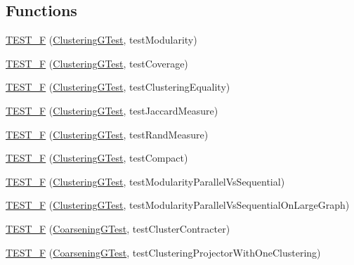 \subsection*{Functions}
\begin{DoxyCompactItemize}
\item 
\hyperlink{namespace_ensemble_clustering_ac45fe66d7953ed455118c45a336be0cb}{T\-E\-S\-T\-\_\-\-F} (\hyperlink{class_ensemble_clustering_1_1_clustering_g_test}{Clustering\-G\-Test}, test\-Modularity)
\item 
\hyperlink{namespace_ensemble_clustering_a393521e257c18ec35cc9cb5e5239f4a1}{T\-E\-S\-T\-\_\-\-F} (\hyperlink{class_ensemble_clustering_1_1_clustering_g_test}{Clustering\-G\-Test}, test\-Coverage)
\item 
\hyperlink{namespace_ensemble_clustering_afb9d4cdf880e8d6707a82c75b446b55a}{T\-E\-S\-T\-\_\-\-F} (\hyperlink{class_ensemble_clustering_1_1_clustering_g_test}{Clustering\-G\-Test}, test\-Clustering\-Equality)
\item 
\hyperlink{namespace_ensemble_clustering_a8adb67d0cc6e2ed490242133515a4e02}{T\-E\-S\-T\-\_\-\-F} (\hyperlink{class_ensemble_clustering_1_1_clustering_g_test}{Clustering\-G\-Test}, test\-Jaccard\-Measure)
\item 
\hyperlink{namespace_ensemble_clustering_aa3cdc65a8af3922812d6aa41000dbf8e}{T\-E\-S\-T\-\_\-\-F} (\hyperlink{class_ensemble_clustering_1_1_clustering_g_test}{Clustering\-G\-Test}, test\-Rand\-Measure)
\item 
\hyperlink{namespace_ensemble_clustering_a8399616ebcd7dcf5c65072c8d68aad40}{T\-E\-S\-T\-\_\-\-F} (\hyperlink{class_ensemble_clustering_1_1_clustering_g_test}{Clustering\-G\-Test}, test\-Compact)
\item 
\hyperlink{namespace_ensemble_clustering_a6dd6c9b037ce0d8d4c95284561dc0993}{T\-E\-S\-T\-\_\-\-F} (\hyperlink{class_ensemble_clustering_1_1_clustering_g_test}{Clustering\-G\-Test}, test\-Modularity\-Parallel\-Vs\-Sequential)
\item 
\hyperlink{namespace_ensemble_clustering_a222422b282415b4bdab472141726e163}{T\-E\-S\-T\-\_\-\-F} (\hyperlink{class_ensemble_clustering_1_1_clustering_g_test}{Clustering\-G\-Test}, test\-Modularity\-Parallel\-Vs\-Sequential\-On\-Large\-Graph)
\item 
\hyperlink{namespace_ensemble_clustering_a05623bcbd204ba1448873a984b90070f}{T\-E\-S\-T\-\_\-\-F} (\hyperlink{class_ensemble_clustering_1_1_coarsening_g_test}{Coarsening\-G\-Test}, test\-Cluster\-Contracter)
\item 
\hyperlink{namespace_ensemble_clustering_abce2945924b1324f856bf108814f18f5}{T\-E\-S\-T\-\_\-\-F} (\hyperlink{class_ensemble_clustering_1_1_coarsening_g_test}{Coarsening\-G\-Test}, test\-Clustering\-Projector\-With\-One\-Clustering)

\end{DoxyCompactItemize}
